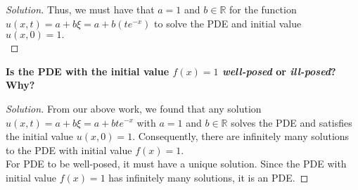\documentclass[11pt]{article}
\newenvironment{solution}
  {\renewcommand\qedsymbol{$\blacksquare$}\begin{proof}[Solution]}
  {\end{proof}}
\begin{document}
\begin{enumerate}[(a)]
\begin{solution}
    Thus, we must have that $a = 1$ and $b \in \mathbb{R}$ for the function $u(x, t) = a+b\xi = a+b(te^{-x})$ to solve the PDE and initial value $u(x, 0) = 1.$ \\
    \end{solution}

    \textbf{Is the PDE with the initial value $f(x) = 1$ \textit{well-posed} or \textit{ill-posed}? Why?}
    \begin{solution} 

    From our above work, we found that any solution $u(x, t) = a + b\xi = a + bte^{-x}$ with $a = 1$ and $b \in \mathbb{R}$ solves the PDE and satisfies the initial value $u(x, 0) = 1.$ 
    Consequently, there are infinitely many solutions to the PDE with initial value $f(x) = 1.$ \\

    For PDE to be well-posed, it must have a unique solution. Since the PDE with initial value $f(x) = 1$ has infinitely many solutions, it is an  PDE.
    \end{solution}
\end{enumerate}
\end{document}
